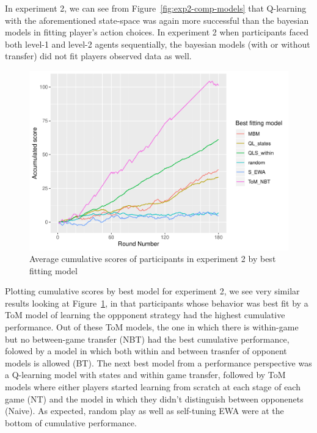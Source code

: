 \documentclass[man,floatsintext]{apa6}
\begin{document}
In experiment 2, we can see from Figure~\ref{fig:exp2-comp-models} that Q-learning with the aforementioned state-space was again more successful than the bayesian models in fitting player's action choices. In experiment 2 when participants faced both level-1 and level-2 agents sequentially, the bayesian models (with or without transfer) did not fit players observed data as well.

\begin{figure}

{\centering \includegraphics{draft_report_v1_files/figure-latex/exp2-cumScores-1} 

}

\caption{Average cumulative scores of participants in experiment 2 by best fitting model}\label{fig:exp2-cumScores}
\end{figure}

Plotting cumulative scores by best model for experiment 2, we see very similar results looking at Figure~\ref{fig:exp2-cumScores}, in that participants whose behavior was best fit by a ToM model of learning the oppponent strategy had the highest cumulative performance. Out of these ToM models, the one in which there is within-game but no between-game transfer (NBT) had the best cumulative performance, folowed by a model in which both within and between trasnfer of opponent models is allowed (BT). The next best model from a performance perspective was a Q-learning model with states and within game transfer, followed by ToM models where either players started learning from scratch at each stage of each game (NT) and the model in which they didn't distinguish between opponenets (Naive). As expected, random play as well as self-tuning EWA were at the bottom of cumulative performance.
\end{document}
